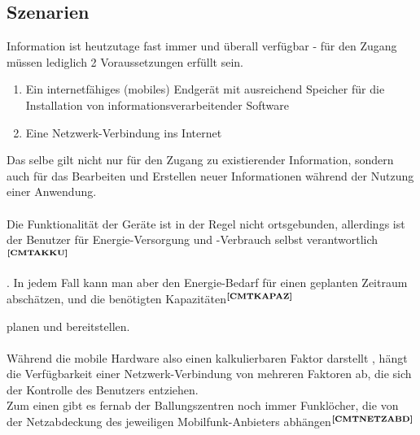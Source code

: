 \subsection{Szenarien}\label{2_SZEN}
Information ist heutzutage fast immer und überall verfügbar - für den Zugang müssen lediglich 2 Voraussetzungen erfüllt sein.
\begin{enumerate}
\item Ein internetfähiges (mobiles) Endgerät mit ausreichend Speicher für die Installation von informationsverarbeitender Software
\item Eine Netzwerk-Verbindung ins Internet
\end{enumerate}
Das selbe gilt nicht nur für den Zugang zu existierender Information, sondern auch für das Bearbeiten und Erstellen neuer Informationen während der Nutzung einer Anwendung.\\ \\
\noindent
Die Funktionalität der Geräte ist in der Regel nicht ortsgebunden, allerdings ist der Benutzer für Energie-Versorgung und -Verbrauch selbst verantwortlich$^{\textbf{\ref{CMTAKKU}}}$%
\addtocounter{footnote}{1}%
. In jedem Fall kann man aber den Energie-Bedarf für einen geplanten Zeitraum abschätzen, und die benötigten Kapazitäten$^{\textbf{\ref{CMTKAPAZ}}}$%
\addtocounter{footnote}{1}%
 planen und bereitstellen.\\ \\
\noindent
Während die mobile Hardware also
einen kalkulierbaren Faktor darstellt%
, hängt die Verfügbarkeit einer Netzwerk-Verbindung von mehreren Faktoren ab, die sich der Kontrolle des Benutzers entziehen.\\
Zum einen gibt es fernab der Ballungszentren noch immer Funklöcher, die von der Netzabdeckung des jeweiligen Mobilfunk-Anbieters abhängen$^{\textbf{\ref{CMTNETZABD}}}$%
